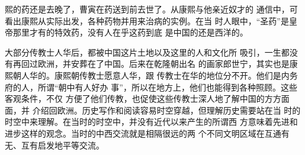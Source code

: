 熙的药还是去晚了，曹寅在药送到前去世了。从康熙与他亲近奴才的%
通信中，可看出康熙从实际出发，各种药物并用来治病的实例。在当%
时人眼中，“圣药”是皇帝那里才有的特效药，没有人在乎这药到底%
是中国的还是西洋的。%
\par
大部分传教士人华后，都被中国这片土地以及这里的人和文化所%
吸引，一生都没有再回过欧洲，并安葬在了中国。后来在乾隆朝出名%
的画家郎世宁，其实也是康熙朝人华的。康熙朝传教士愿意人华，跟%
传教士在华的地位分不开。他们是内务府的人，所谓“朝中有人好办%
事”，所以在地方上，他们也能得到各种照顾。这些客观条件，不仅%
方便了他们传教，也促使这些传教士深人地了解中国的方方面面，并%
介绍回欧洲。历史写作和阅读容易时空穿越，但理解历史需要站在当%
时的时空中来理解。在当时的时空中，并没有近代以来产生的所谓西%
方意味着先进和进步这样的观念。当时的中西交流就是相隔很远的两%
个不同文明区域在互通有无、互有启发地平等交流。%
